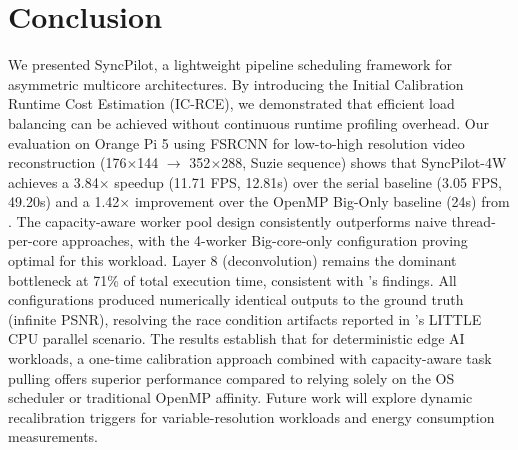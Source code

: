 \documentclass[conference]{IEEEtran}
\begin{document}
\section{Conclusion}
We presented SyncPilot, a lightweight pipeline scheduling framework for asymmetric multicore architectures. By introducing the Initial Calibration Runtime Cost Estimation (IC-RCE), we demonstrated that efficient load balancing can be achieved without continuous runtime profiling overhead. Our evaluation on Orange Pi 5 using FSRCNN for low-to-high resolution video reconstruction (176$\times$144 $\rightarrow$ 352$\times$288, Suzie sequence) shows that SyncPilot-4W achieves a 3.84$\times$ speedup (11.71 FPS, 12.81s) over the serial baseline (3.05 FPS, 49.20s) and a 1.42$\times$ improvement over the OpenMP Big-Only baseline (24s) from \cite{annisa2025fsrcnn}. The capacity-aware worker pool design consistently outperforms naive thread-per-core approaches, with the 4-worker Big-core-only configuration proving optimal for this workload. Layer 8 (deconvolution) remains the dominant bottleneck at 71\% of total execution time, consistent with \cite{annisa2025fsrcnn}'s findings. All configurations produced numerically identical outputs to the ground truth (infinite PSNR), resolving the race condition artifacts reported in \cite{annisa2025fsrcnn}'s LITTLE CPU parallel scenario. The results establish that for deterministic edge AI workloads, a one-time calibration approach combined with capacity-aware task pulling offers superior performance compared to relying solely on the OS scheduler or traditional OpenMP affinity. Future work will explore dynamic recalibration triggers for variable-resolution workloads and energy consumption measurements.
\end{document}
